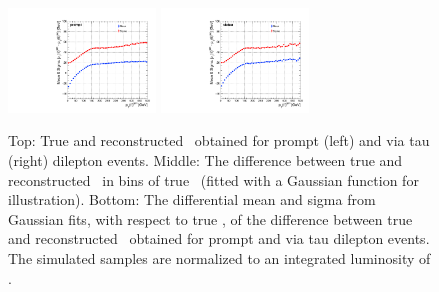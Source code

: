 \begin{figure}
\begin{center}
    \includegraphics[width=0.35\textwidth]{fig_fullRun2UL/KinRecoResolutions/ttbar_pT_multiresidual_prompt.pdf}
    \includegraphics[width=0.35\textwidth]{fig_fullRun2UL/KinRecoResolutions/ttbar_pT_multiresidual_viatau.pdf}\\
    \caption{\small Top: True and reconstructed \pttt\ obtained for prompt (left) and via tau (right) \ttbar dilepton events.
    Middle: The difference between true and reconstructed \pttt\ in bins of true \pttt\ (fitted with a Gaussian function for illustration).
    Bottom: The differential mean and sigma from Gaussian fits, with respect to true \pttt, of the difference between true and reconstructed \pttt\ obtained for prompt and via tau \ttbar dilepton events.
    The simulated samples are normalized to an integrated luminosity of \lumivalueRuniiUL.}
    \label{fig:kinrec:resolution-pttt}
 \end{center}
\end{figure}

